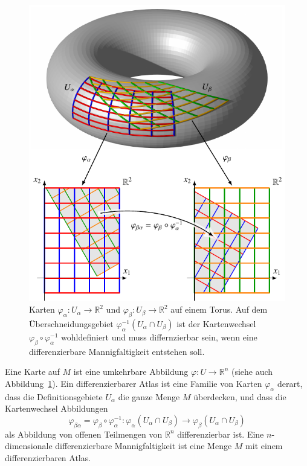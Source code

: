 \begin{figure}
\centering
\includegraphics{chapters/60-gruppen/images/karten.pdf}
\caption{Karten
$\varphi_\alpha\colon U_\alpha\to \mathbb{R}^2$
und
$\varphi_\beta\colon U_\beta\to \mathbb{R}^2$
auf einem Torus.
Auf dem Überschneidungsgebiet $\varphi_\alpha^{-1}(U_\alpha\cap U_\beta)$
ist der Kartenwechsel $\varphi_\beta\circ\varphi_\alpha^{-1}$ wohldefiniert
und muss differnzierbar sein, wenn eine differenzierbare Mannigfaltigkeit
entstehen soll.
\label{buch:gruppen:fig:karten}}
\end{figure}

\begin{definition}
Eine Karte auf $M$ ist eine umkehrbare Abbildung
$\varphi\colon U\to \mathbb{R}^n$ (siehe auch
Abbildung~\ref{buch:gruppen:fig:karten}).
Ein differenzierbarer Atlas ist eine Familie von Karten $\varphi_\alpha$
derart, dass die Definitionsgebiete $U_\alpha$ die ganze Menge $M$
überdecken, und dass die Kartenwechsel Abbildungen
\[
\varphi_{\beta\alpha}=\varphi_\beta\circ\varphi_\alpha^{-1}
\colon
\varphi_\alpha(U_\alpha\cap U_\beta)
\to
\varphi_\beta(U_\alpha\cap U_\beta)
\]
als Abbildung von offenen Teilmengen von $\mathbb{R}^n$ differenzierbar
ist.
Eine {$n$-dimensionale differenzierbare Mannigfaltigkeit} ist eine
Menge $M$ mit einem differenzierbaren Atlas.
\end{definition}

